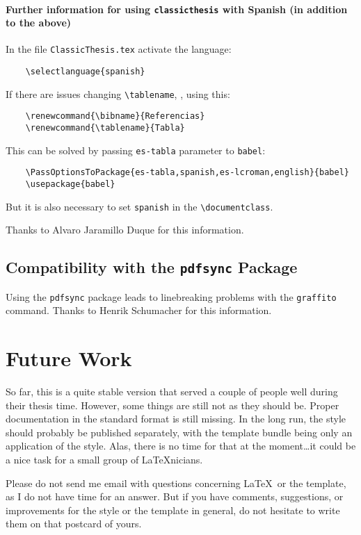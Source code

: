 \paragraph{Further information for using \texttt{classicthesis} with Spanish (in addition to the above)}
In the file \texttt{ClassicThesis.tex} activate the language: 
\begin{verbatim}
    \selectlanguage{spanish}
\end{verbatim}
    
If there are issues changing \verb|\tablename|, \eg, using this:
\begin{verbatim}
    \renewcommand{\bibname}{Referencias}
    \renewcommand{\tablename}{Tabla}
\end{verbatim}

This can be solved by passing \texttt{es-tabla} parameter to \texttt{babel}:
\begin{verbatim}
    \PassOptionsToPackage{es-tabla,spanish,es-lcroman,english}{babel}
    \usepackage{babel}
\end{verbatim}

But it is also necessary to set \texttt{spanish} in the \verb|\documentclass|.

Thanks to Alvaro Jaramillo Duque for this information. 


\subsection*{Compatibility with the \texttt{pdfsync} Package}
Using the \texttt{pdfsync} package leads to linebreaking problems with the \texttt{graffito} command. 
Thanks to Henrik Schumacher for this information. 



\section{Future Work}
So far, this is a quite stable version that served a couple of people
well during their thesis time. However, some things are still not as
they should be. Proper documentation in the standard format is still
missing. In the long run, the style should probably be published
separately, with the template bundle being only an application of the
style. Alas, there is no time for that at the moment\dots it could be
a nice task for a small group of \LaTeX nicians.

Please do not send me email with questions concerning \LaTeX\ or the
template, as I do not have time for an answer. But if you have
comments, suggestions, or improvements for the style or the template
in general, do not hesitate to write them on that postcard of yours.


